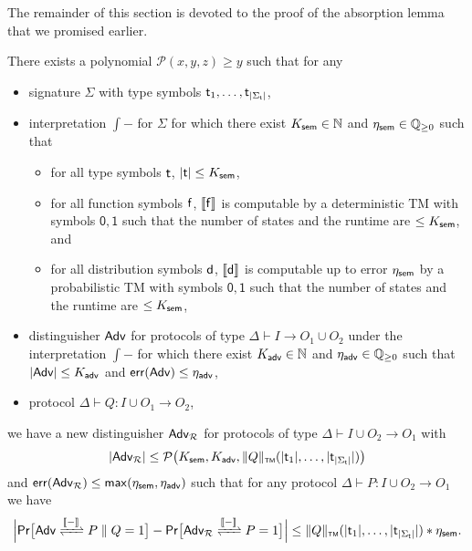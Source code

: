 
\noindent The remainder of this section is devoted to the proof of the absorption lemma that we promised earlier.

\begin{lemma}[Absorption]
There exists a polynomial $\mathcal{P}(x,y,z) \geq y$ such that for any
\begin{itemize}
\item \ipdl signature $\Sigma$ with type symbols $\mathsf{t}_1,\ldots,\mathsf{t}_{|\Sigma_\mathsf{t}|}$,

\item interpretation $\int{-}$ for $\Sigma$ for which there exist $K_{\mathsf{sem}} \in \mathbb{N}$ and $\eta_{\mathsf{sem}} \in \mathbb{Q}_{\geq 0}$ such that
\begin{itemize}
\item for all type symbols $\mathsf{t}$, $|\mathsf{t}| \leq K_{\mathsf{sem}}$,

\item for all function symbols $\mathsf{f}$, $\llbracket \mathsf{f} \rrbracket$ is computable by a deterministic TM with symbols $\mathsf{0}, \mathsf{1}$ such that the number of states and the runtime are $\leq K_{\mathsf{sem}}$, and

\item for all distribution symbols $\mathsf{d}$, $\llbracket \mathsf{d} \rrbracket$ is computable up to error $\eta_{\mathsf{sem}}$ by a probabilistic TM with symbols $\mathsf{0}, \mathsf{1}$ such that the number of states and the runtime are $\leq K_{\mathsf{sem}}$,
\end{itemize}

\item distinguisher $\mathsf{Adv}$ for protocols of type $\Delta \vdash I \to O_1 \cup O_2$ under the interpretation $\int{-}$ for which there exist $K_{\mathsf{adv}} \in \mathbb{N}$ and $\eta_{\mathsf{adv}} \in \mathbb{Q}_{\geq 0}$ such that $|\mathsf{Adv}| \leq K_{\mathsf{adv}}$ and $\mathsf{err}(\mathsf{Adv}) \leq \eta_{\mathsf{adv}}$,

\item protocol $\Delta \vdash Q : I \cup O_1 \to O_2$,
\end{itemize}
we have a new distinguisher $\mathsf{Adv}_\mathcal{R}$ for protocols of type $\Delta \vdash I \cup O_2 \to O_1$ with
\[|\mathsf{Adv}_\mathcal{R}| \leq \mathcal{P}\big(K_{\mathsf{sem}},K_{\mathsf{adv}},\Vert Q \Vert_{\scriptscriptstyle \mathsf{TM}}(|\mathsf{t}_1|,\ldots,|\mathsf{t}_{|\Sigma_\mathsf{t}|}|)\big)\]
and $\mathsf{err}(\mathsf{Adv}_\mathcal{R}) \leq \mathsf{max}(\eta_{\mathsf{sem}},\eta_{\mathsf{adv}})$ such that for any protocol $\Delta \vdash P : I \cup O_2 \to O_1$ we have
\[\Big|\mathsf{Pr}\big[\interaction{\Adv}{\Par{P}{Q}}{\int{-}} = 1\big] - \mathsf{Pr}\big[\interaction{\Adv_\mathcal{R}}{P}{\int{-}} = 1\big]\Big| \leq \tmnorm{Q}(|\type_1|,\ldots,|\type_{|\Sigma_\mathsf{t}|}|) * \eta_\sem.\]
\end{lemma}

